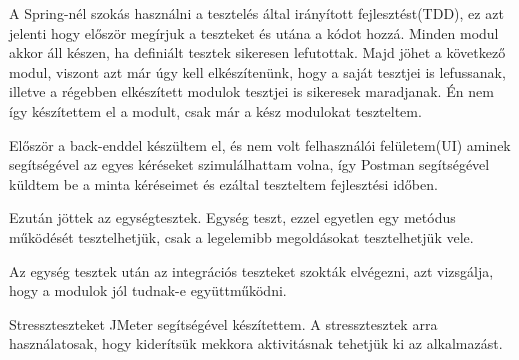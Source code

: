 A Spring-nél szokás használni a tesztelés által irányított fejlesztést(TDD), ez azt jelenti hogy először megírjuk a teszteket és utána a kódot hozzá. Minden modul akkor áll készen, ha definiált tesztek sikeresen lefutottak. Majd jöhet a következő modul, viszont azt már úgy kell elkészítenünk, hogy a saját tesztjei is lefussanak, illetve a régebben elkészített modulok tesztjei is sikeresek maradjanak. Én nem így készítettem el a modult, csak már a kész modulokat teszteltem.

Először a back-enddel készültem el, és nem volt felhasználói felületem(UI) aminek segítségével az egyes kéréseket szimulálhattam volna, így Postman segítségével küldtem be a minta kéréseimet és ezáltal teszteltem fejlesztési időben.

Ezután jöttek az egységtesztek.
Egység teszt, ezzel egyetlen egy metódus működését tesztelhetjük, csak a  legelemibb megoldásokat tesztelhetjük vele.

Az egység tesztek után az integrációs teszteket szokták elvégezni, azt vizsgálja, hogy a modulok jól tudnak-e együttműködni.

Stresszteszteket JMeter segítségével készítettem. A stressztesztek arra használatosak, hogy kiderítsük mekkora aktivitásnak tehetjük ki az alkalmazást.